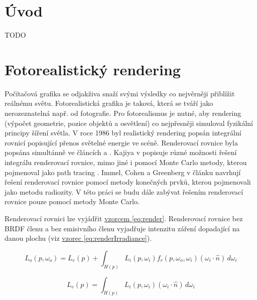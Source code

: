 \documentclass[czech,master]{diploma}
\newcommand{\uvec}[1]{\hat{#1}}
\newcommand{\point}{p}
\newcommand{\brdf}{f_r\left(\point,\omega_{o},\omega_{i}\right)}
\newcommand{\normVec}{\uvec{n}}
\newcommand{\inVec}{\omega_{i}}
\newcommand{\outVec}{\omega_{o}}
\newcommand{\outRadiance}{L_o \left( \point,\outVec \right)}
\newcommand{\inRadiance}{L_i \left( \point,\inVec \right)}
\newcommand{\emitRadiance}{L_e \left( \point \right)}
\newcommand{\inDotNorm}{\left( \inVec \cdot \normVec \right)}
\begin{document}
\MakeTitlePages

\chapter{Úvod}
TODO
\clearpage
\chapter{Fotorealistický rendering}
Počítačová grafika se odjakživa snaží svými výsledky co nejvěrněji přiblížit reálnému světu. Fotorealistická grafika je taková, která se tváří jako nerozeznatelná např. od fotografie. Pro fotorealismus je nutné, aby rendering (výpočet geometrie, pozice objektů a osvětlení) co nejpřesněji simuloval fyzikální principy šíření světla. V roce 1986 byl realistický rendering popsán integrální rovnicí popisující přenos světelné energie ve scéně. Renderovací rovnice byla popsána simultánně ve článcích \cite{KajiyaRenderEq} a \cite{ImmelRenderEq}. Kajiya v \cite{KajiyaRenderEq} popisuje různé možnosti řešení integrálu renderovací rovnice, mimo jiné i pomocí Monte Carlo metody, kterou pojmenoval jako path tracing \cite{HainesRayTracingGems2019}. Immel, Cohen a Greenberg v článku \cite{ImmelRenderEq} navrhují řešení renderovací rovnice pomocí metody konečných prvků, kterou pojmenovali jako metodu radiozity. V této práci se budu dále zabývat řešením renderovací rovnice pouze pomocí metody Monte Carlo. \par
Renderovací rovnici lze vyjádřit \hyperref[eq:render]{vzorcem \ref{eq:render}}. Renderovací rovnice bez BRDF členu a bez emisivního členu vyjadřuje intenzitu záření dopadající na danou plochu (viz \hyperref[eq:renderIrradiance]{vzorec \ref{eq:renderIrradiance}})\cite{Dutre2003GICompendum}.

\begin{equation} \label{eq:render}
  \outRadiance = \emitRadiance + \int_{H \left( \point \right)}^{~}\inRadiance \brdf \inDotNorm \,d\inVec
\end{equation}

\begin{equation} \label{eq:renderIrradiance}
  \emitRadiance = \int_{H \left( \point \right)}^{~}\inRadiance \inDotNorm \,d\inVec
\end{equation}
\end{document}
